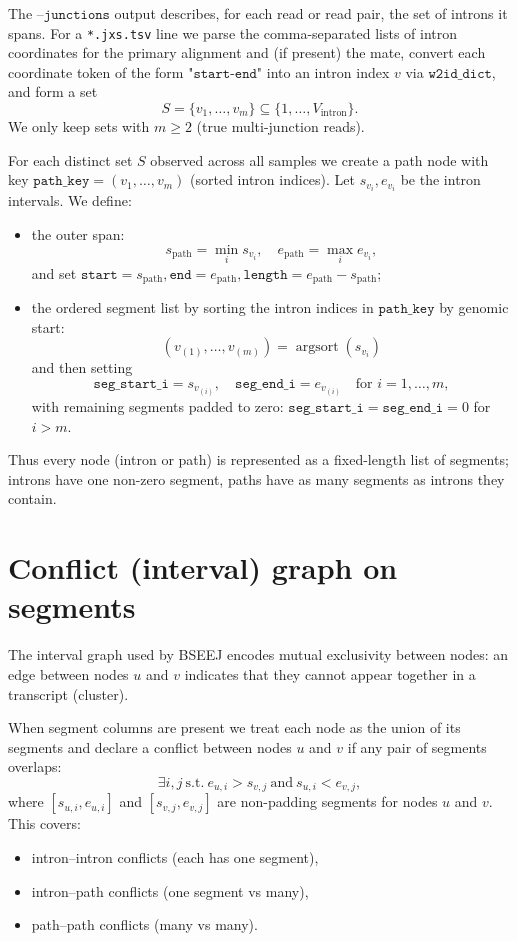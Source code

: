 \documentclass[11pt]{article}
\begin{document}
The \(\texttt{--junctions}\) output describes, for each read or read pair, the
set of introns it spans. For a \texttt{*.jxs.tsv} line we parse the
comma-separated lists of intron coordinates for the primary alignment
and (if present) the mate, convert each coordinate token of the form
\(\texttt{"start-end"}\) into an intron index \(v\) via
\(\texttt{w2id\_dict}\), and form a set
\[
  S = \{v_1,\dots,v_m\} \subseteq \{1,\dots,V_{\text{intron}}\}.
\]
We only keep sets with \(m \ge 2\) (true multi-junction reads).

For each distinct set \(S\) observed across all samples we create a path node
with key \(\texttt{path\_key} = (v_1,\dots,v_m)\) (sorted intron indices).
Let \(s_{v_i}, e_{v_i}\) be the intron intervals. We define:
\begin{itemize}
  \item the outer span:
  \[
    s_{\mathrm{path}} = \min_i s_{v_i},\quad
    e_{\mathrm{path}} = \max_i e_{v_i},
  \]
  and set
  \(\texttt{start} = s_{\mathrm{path}}, \texttt{end} = e_{\mathrm{path}},
    \texttt{length} = e_{\mathrm{path}} - s_{\mathrm{path}}\);
  \item the ordered segment list by sorting the intron indices in
  \(\texttt{path\_key}\) by genomic start:
  \[
    (v_{(1)},\dots,v_{(m)}) =
    \operatorname{argsort}(s_{v_i})
  \]
  and then setting
  \[
    \texttt{seg\_start\_i} = s_{v_{(i)}},\quad
    \texttt{seg\_end\_i}   = e_{v_{(i)}}\quad \text{for } i = 1,\dots,m,
  \]
  with remaining segments padded to zero:
  \(\texttt{seg\_start\_i} = \texttt{seg\_end\_i} = 0\) for \(i>m\).
\end{itemize}

Thus every node (intron or path) is represented as a fixed-length list of
segments; introns have one non-zero segment, paths have as many segments as
introns they contain.

\section{Conflict (interval) graph on segments}

The interval graph used by BSEEJ encodes mutual exclusivity between nodes:
an edge between nodes \(u\) and \(v\) indicates that they cannot appear
together in a transcript (cluster).

When segment columns are present we treat each node as the union of its
segments and declare a conflict between nodes \(u\) and \(v\) if any pair
of segments overlaps:
\[
  \exists i,j \ \text{s.t.}\
    e_{u,i} > s_{v,j} \ \text{and}\ s_{u,i} < e_{v,j},
\]
where \([s_{u,i},e_{u,i}]\) and \([s_{v,j},e_{v,j}]\) are non-padding
segments for nodes \(u\) and \(v\). This covers:
\begin{itemize}
  \item intron–intron conflicts (each has one segment),
  \item intron–path conflicts (one segment vs many),
  \item path–path conflicts (many vs many).
\end{itemize}
\end{document}
